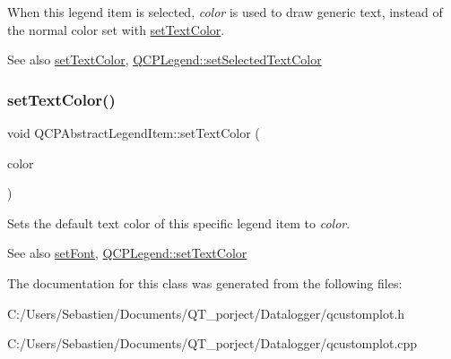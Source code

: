 When this legend item is selected, {\itshape color} is used to draw generic text, instead of the normal color set with \hyperlink{class_q_c_p_abstract_legend_item_a6ebace6aaffaedcdab2d74e88acc2d1e}{set\+Text\+Color}.

\begin{DoxySeeAlso}{See also}
\hyperlink{class_q_c_p_abstract_legend_item_a6ebace6aaffaedcdab2d74e88acc2d1e}{set\+Text\+Color}, \hyperlink{class_q_c_p_legend_a7674dfc7a1f30e1abd1018c0ed45e0bc}{Q\+C\+P\+Legend\+::set\+Selected\+Text\+Color} 
\end{DoxySeeAlso}
\mbox{\label{class_q_c_p_abstract_legend_item_a6ebace6aaffaedcdab2d74e88acc2d1e}} 
\subsubsection{\texorpdfstring{set\+Text\+Color()}{setTextColor()}}
{\footnotesize\ttfamily void Q\+C\+P\+Abstract\+Legend\+Item\+::set\+Text\+Color (\begin{DoxyParamCaption}\item[{const Q\+Color \&}]{color }\end{DoxyParamCaption})}

Sets the default text color of this specific legend item to {\itshape color}.

\begin{DoxySeeAlso}{See also}
\hyperlink{class_q_c_p_abstract_legend_item_a409c53455d8112f71d70c0c43eb10265}{set\+Font}, \hyperlink{class_q_c_p_legend_ae1eb239ff4a4632fe1b6c3e668d845c6}{Q\+C\+P\+Legend\+::set\+Text\+Color} 
\end{DoxySeeAlso}


The documentation for this class was generated from the following files\+:\begin{DoxyCompactItemize}
\item 
C\+:/\+Users/\+Sebastien/\+Documents/\+Q\+T\+\_\+porject/\+Datalogger/qcustomplot.\+h\item 
C\+:/\+Users/\+Sebastien/\+Documents/\+Q\+T\+\_\+porject/\+Datalogger/qcustomplot.\+cpp\end{DoxyCompactItemize}
